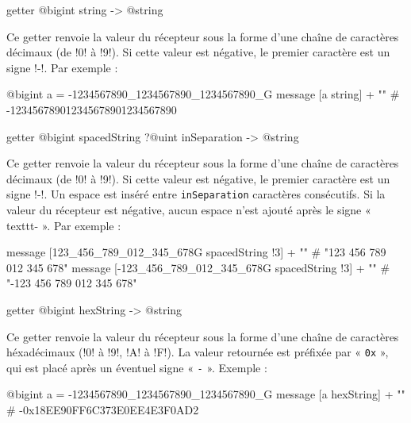 
\begin{galgasbox}
getter @bigint string -> @string
\end{galgasbox}

Ce getter renvoie la valeur du récepteur sous la forme d'une chaîne de caractères décimaux (de \ggs!0! à \ggs!9!). Si cette valeur est négative, le premier caractère est un signe \ggs!-!. Par exemple :

\begin{galgas}
@bigint a = -1234567890_1234567890_1234567890_G
message [a string] + "\n" # -123456789012345678901234567890
\end{galgas}




\begin{galgasbox}
getter @bigint spacedString ?@uint inSeparation -> @string
\end{galgasbox}

Ce getter renvoie la valeur du récepteur sous la forme d'une chaîne de caractères décimaux (de \ggs!0! à \ggs!9!). Si cette valeur est négative, le premier caractère est un signe \ggs!-!. Un espace est inséré entre \texttt{inSeparation} caractères consécutifs. Si la valeur du récepteur est négative, aucun espace n'est ajouté après le signe « texttt{-} ». Par exemple :

\begin{galgas}
message [123_456_789_012_345_678G spacedString !3] + "\n" # "123 456 789 012 345 678"
message [-123_456_789_012_345_678G spacedString !3] + "\n" # "-123 456 789 012 345 678"
\end{galgas}






\begin{galgasbox}
getter @bigint hexString -> @string
\end{galgasbox}

Ce getter renvoie la valeur du récepteur sous la forme d'une chaîne de caractères héxadécimaux (\ggs!0! à \ggs!9!, \ggs!A! à \ggs!F!). La valeur retournée est préfixée par « \texttt{0x} », qui est placé après un éventuel signe « \texttt{-} ». Exemple :

\begin{galgas}
@bigint a = -1234567890_1234567890_1234567890_G
message [a hexString] + "\n" # -0x18EE90FF6C373E0EE4E3F0AD2
\end{galgas}








